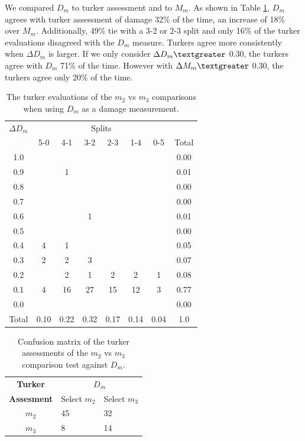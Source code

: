 We compared $D_m$ to turker assessment and to $M_m$. As shown in Table \ref{m2table}, $D_m$ agrees with turker assessment of damage 32\% of the time, an increase of 18\% over $M_m$. Additionally, 49\% tie with a 3-2 or 2-3 split and only 16\% of the turker evaluations disagreed with the $D_m$ measure. Turkers agree more consistently when {$\Delta D_m$} is larger. If we only consider {$\Delta D_m \textgreater$} 0.30, the turkers agree with $D_m$ 71\% of the time. However with {$\Delta M_m \textgreater$} 0.30, the turkers agree only 20\% of the time. 


\begin{table}
\begin{tabular}{ c | c | c | c | c | c | c || c}
    {$\Delta D_m$} &  \multicolumn{6}{c}{Splits}\\
  & 5-0 & 4-1 & 3-2 & 2-3 & 1-4 & 0-5 & Total\\
\hline
1.0 &  &  &  &  &  & & 0.00\\
0.9 &  & 1 &  &  &  & & 0.01\\
0.8 &  &  &  &  &  & & 0.00\\
0.7 &  &  &  &  &  & & 0.00\\
0.6 &  &  & 1 &  &  & & 0.01\\
0.5 &  &  &  &  &  & & 0.00\\
0.4 & 4 & 1 &  &  &  & & 0.05\\
0.3 & 2 & 2 & 3 &  &  & & 0.07\\
0.2 &  & 2 & 1 & 2 & 2 & 1& 0.08\\
0.1 & 4 & 16 & 27 & 15 & 12 & 3& 0.77\\
0.0 &  &  &  &  &  & & 0.00\\
\hline
Total & 0.10 & 0.22 & 0.32 & 0.17 & 0.14 & 0.04 & 1.0
\end{tabular}
  \caption{The turker evaluations of the $m_2$ vs $m_3$ comparisons when using $D_m$ as a damage measurement.}
  \label{m2table}
\end{table}



\begin{table}
\centering
\begin{tabular}{cll}
\textbf{Turker} & \multicolumn{2}{c}{ \textbf{ $D_{m}$}}                           \\
\textbf{Assesment}                  &          Select $m_{2}$             &           Select $m_{3}$             \\ \cline{2-3} 
       $m_{2}$           & \multicolumn{1}{|l}{45} & \multicolumn{1}{|l|}{32} \\ \cline{2-3} 
       $m_{3}$           & \multicolumn{1}{|l}{8} & \multicolumn{1}{|l|}{14} \\ \cline{2-3} 
\end{tabular}
  \caption{Confusion matrix of the turker assessments of the $m_2$ vs $m_3$ comparison test against $D_m$.}
  \label{m2cm}
\end{table}



